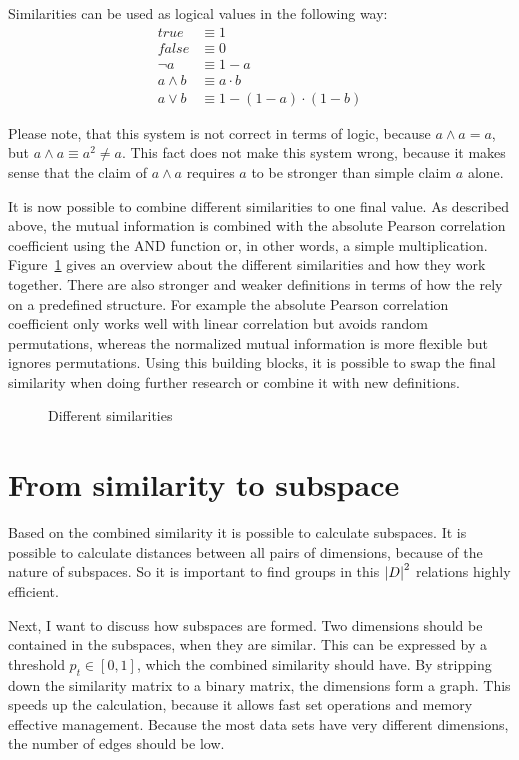 \begin{envdef}
	Similarities can be used as logical values in the following way:
	\begin{align}
		true &\equiv 1\\
		false &\equiv 0\\
		\neg a &\equiv 1 - a\\
		a \wedge b &\equiv a \cdot b\\
		a \vee b &\equiv 1 - (1 - a) \cdot (1 - b)
	\end{align}
\end{envdef}

Please note, that this system is not correct in terms of logic, because $a \wedge a = a$, but $a \wedge a \equiv a^2 \neq a$. This fact does not make this system wrong, because it makes sense that the claim of $a \wedge a$ requires $a$ to be stronger than simple claim $a$ alone.

It is now possible to combine different similarities to one final value. As described above, the mutual information is combined with the absolute Pearson correlation coefficient using the AND function or, in other words, a simple multiplication. Figure~\ref{fig:similarities} gives an overview about the different similarities and how they work together. There are also stronger and weaker definitions in terms of how the rely on a predefined structure. For example the absolute Pearson correlation coefficient only works well with linear correlation but avoids random permutations, whereas the normalized mutual information is more flexible but ignores permutations. Using this building blocks, it is possible to swap the final similarity when doing further research or combine it with new definitions.

\begin{figure}
	\centering
	
	\caption{Different similarities}
	\label{fig:similarities}
\end{figure}

\section{From similarity to subspace}
Based on the combined similarity it is possible to calculate subspaces. It is possible to calculate distances between all pairs of dimensions, because of the nature of subspaces. So it is important to find groups in this $\left|D\right|^2$ relations highly efficient.

Next, I want to discuss how subspaces are formed. Two dimensions should be contained in the subspaces, when they are similar. This can be expressed by a threshold $p_t \in [0,1]$, which the combined similarity should have. By stripping down the similarity matrix to a binary matrix, the dimensions form a graph. This speeds up the calculation, because it allows fast set operations and memory effective management. Because the most data sets have very different dimensions, the number of edges should be low.

